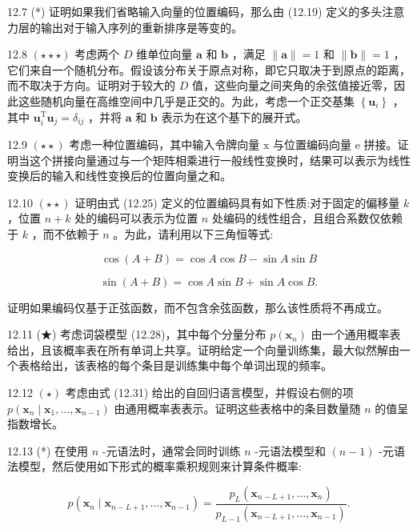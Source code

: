 \documentclass[10pt]{article}
\begin{document}
12.7 (*) 证明如果我们省略输入向量的位置编码，那么由 (12.19) 定义的多头注意力层的输出对于输入序列的重新排序是等变的。

12.8 \(\left( {\star  \star   \star  }\right)\) 考虑两个 \(D\) 维单位向量 \(\mathbf{a}\) 和 \(\mathbf{b}\) ，满足 \(\parallel \mathbf{a}\parallel  = 1\) 和 \(\parallel \mathbf{b}\parallel  = 1\) ，它们来自一个随机分布。假设该分布关于原点对称，即它只取决于到原点的距离，而不取决于方向。证明对于较大的 \(D\) 值，这些向量之间夹角的余弦值接近零，因此这些随机向量在高维空间中几乎是正交的。为此，考虑一个正交基集 \(\left\{  {\mathbf{u}}_{i}\right\}\) ，其中 \({\mathbf{u}}_{i}^{\mathrm{T}}{\mathbf{u}}_{j} = {\delta }_{ij}\) ，并将 \(\mathbf{a}\) 和 \(\mathbf{b}\) 表示为在这个基下的展开式。

12.9 \(\left( {\star  \star  }\right)\) 考虑一种位置编码，其中输入令牌向量 \(\mathrm{x}\) 与位置编码向量 e 拼接。证明当这个拼接向量通过与一个矩阵相乘进行一般线性变换时，结果可以表示为线性变换后的输入和线性变换后的位置向量之和。

12.10 \(\left( {\star  \star  }\right)\) 证明由式 (12.25) 定义的位置编码具有如下性质:对于固定的偏移量 \(k\) ，位置 \(n + k\) 处的编码可以表示为位置 \(n\) 处编码的线性组合，且组合系数仅依赖于 \(k\) ，而不依赖于 \(n\) 。为此，请利用以下三角恒等式:

\[
\cos \left( {A + B}\right)  = \cos A\cos B - \sin A\sin B \tag{12.44}
\]

\[
\sin \left( {A + B}\right)  = \cos A\sin B + \sin A\cos B. \tag{12.45}
\]

证明如果编码仅基于正弦函数，而不包含余弦函数，那么该性质将不再成立。

12.11 (★) 考虑词袋模型 (12.28)，其中每个分量分布 \(p\left( {\mathbf{x}}_{n}\right)\) 由一个通用概率表给出，且该概率表在所有单词上共享。证明给定一个向量训练集，最大似然解由一个表格给出，该表格的每个条目是训练集中每个单词出现的频率。

12.12 \(\left( \star \right)\) 考虑由式 (12.31) 给出的自回归语言模型，并假设右侧的项 \(p\left( {{\mathbf{x}}_{n} \mid  {\mathbf{x}}_{1},\ldots ,{\mathbf{x}}_{n - 1}}\right)\) 由通用概率表表示。证明这些表格中的条目数量随 \(n\) 的值呈指数增长。

12.13 (*) 在使用 \(n\) -元语法时，通常会同时训练 \(n\) -元语法模型和 \(\left( {n - 1}\right)\) -元语法模型，然后使用如下形式的概率乘积规则来计算条件概率:

\[
p\left( {{\mathbf{x}}_{n} \mid  {\mathbf{x}}_{n - L + 1},\ldots ,{\mathbf{x}}_{n - 1}}\right)  = \frac{{p}_{L}\left( {{\mathbf{x}}_{n - L + 1},\ldots ,{\mathbf{x}}_{n}}\right) }{{p}_{L - 1}\left( {{\mathbf{x}}_{n - L + 1},\ldots ,{\mathbf{x}}_{n - 1}}\right) }. \tag{12.46}
\]
\end{document}
